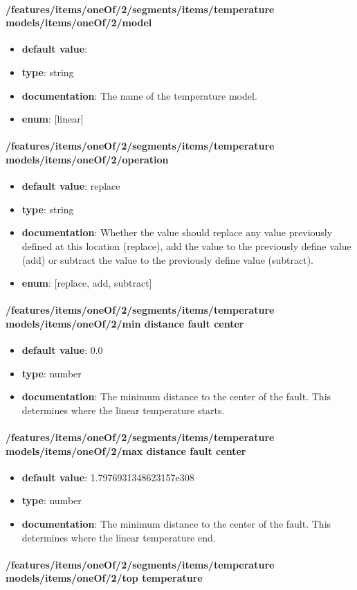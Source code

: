 \paragraph{/features/items/oneOf/2/segments/items/temperature models/items/oneOf/2/model}
\begin{itemize}\item {\bf default value}: 
\item {\bf type}: string
\item {\bf documentation}: The name of the temperature model.
\item {\bf enum}: [linear]\end{itemize}\paragraph{/features/items/oneOf/2/segments/items/temperature models/items/oneOf/2/operation}
\begin{itemize}\item {\bf default value}: replace
\item {\bf type}: string
\item {\bf documentation}: Whether the value should replace any value previously defined at this location (replace), add the value to the previously define value (add) or subtract the value to the previously define value (subtract).
\item {\bf enum}: [replace, add, subtract]\end{itemize}\paragraph{/features/items/oneOf/2/segments/items/temperature models/items/oneOf/2/min distance fault center}
\begin{itemize}\item {\bf default value}: 0.0
\item {\bf type}: number
\item {\bf documentation}: The minimum distance to the center of the fault. This determines where the linear temperature starts.
\end{itemize}\paragraph{/features/items/oneOf/2/segments/items/temperature models/items/oneOf/2/max distance fault center}
\begin{itemize}\item {\bf default value}: 1.7976931348623157e308
\item {\bf type}: number
\item {\bf documentation}: The minimum distance to the center of the fault. This determines where the linear temperature end.
\end{itemize}\paragraph{/features/items/oneOf/2/segments/items/temperature models/items/oneOf/2/top temperature}

